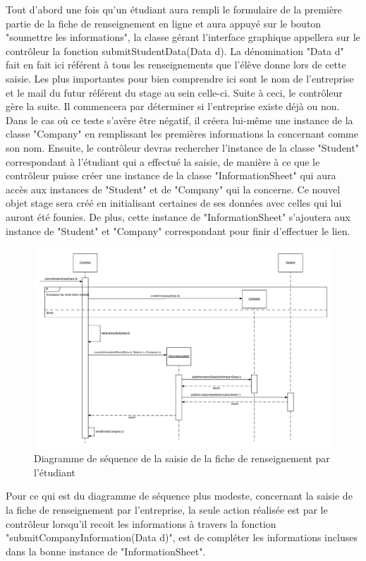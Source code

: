 \documentclass{scrreprt}
\begin{document}
	Tout d'abord une fois qu'un étudiant aura rempli le formulaire de la première partie de la fiche de renseignement en ligne et aura
appuyé sur le bouton "soumettre les informations", la classe gérant l'interface graphique appellera sur le contrôleur la fonction 
submitStudentData(Data d). La dénomination "Data d" fait en fait ici référent à tous les renseignements que l'élève donne lors de 
cette saisie. Les plus importantes pour bien comprendre ici sont le nom de l'entreprise et le mail du futur référent du stage au sein
celle-ci. Suite à ceci, le contrôleur gère la suite. Il commencera par déterminer si l'entreprise existe déjà ou non. Dans le cas où
ce teste s'avère être négatif, il créera lui-même une instance de la classe "Company" en remplissant les premières informations la 
concernant comme son nom. Ensuite, le contrôleur devras rechercher l'instance de la classe "Student" correspondant à l'étudiant qui
a effectué la saisie, de manière à ce que le contrôleur puisse créer une instance de la classe "InformationSheet" qui aura accès aux instances
de "Student" et de "Company" qui la concerne. Ce nouvel objet stage sera créé en initialisant certaines de ses données avec celles qui lui
auront été founies. De plus, cette instance de "InformationSheet" s'ajoutera aux instance de "Student" et "Company" correspondant pour finir 
d'effectuer le lien.

\newpage
\begin{figure}[h]
\centering
\includegraphics[width=15cm]{images/submitStudentSeqDiagram.png}
\caption{Diagramme de séquence de la saisie de la fiche de renseignement par l'étudiant}
\end{figure}

	Pour ce qui est du diagramme de séquence plus modeste, concernant la saisie de la fiche de renseignement par l'entreprise, 
la seule action réalisée est par le contrôleur lorsqu'il recoit les informations à travers la fonction "submitCompanyInformation(Data d)",
est de compléter les informations incluses dans la bonne instance de "InformationSheet".
\end{document}
